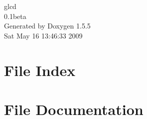 \documentclass[a4paper]{book}
\begin{document}
\begin{titlepage}
\vspace*{7cm}
\begin{center}
{\Large glcd \\[1ex]\large 0.1beta }\\
\vspace*{1cm}
{\large Generated by Doxygen 1.5.5}\\
\vspace*{0.5cm}
{\small Sat May 16 13:46:33 2009}\\
\end{center}
\end{titlepage}
\clearemptydoublepage
{}
\tableofcontents
\clearemptydoublepage
{}
\chapter{File Index}

\chapter{File Documentation}




\printindex
\end{document}
